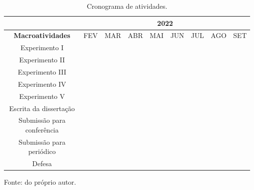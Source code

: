 \begin{table}[H]
    \centering
    \caption{Cronograma de atividades.}
    \label{proposal:cron:table:2}
        \begin{tabular}{|c|c|c|c|c|c|c|l|l|} 
            \hline
                                    & \multicolumn{8}{c|}{2022}                        \\ 
            \hline
            \textbf{Macroatividades}        & FEV & MAR & ABR & MAI & JUN & JUL & AGO & SET  \\ 
            \hline
            Experimento I                   & \cellcolor{midgray} & \cellcolor{midgray} & \cellcolor{midgray} & \cellcolor{midgray} & \cellcolor{midgray} & \cellcolor{midgray} &     &      \\ 
            \hline
            Experimento II                  &     & \cellcolor{midgray} & \cellcolor{midgray} &     &     &     &     &      \\ 
            \hline
            Experimento III                 &     &     &     & \cellcolor{midgray} & \cellcolor{midgray} & \cellcolor{midgray} &     &  \\ 
            \hline
            Experimento IV                  &     &     &     & \cellcolor{midgray} & \cellcolor{midgray} &     &     &      \\ 
            \hline
            Experimento V                   &     &     &     &     &     & \cellcolor{midgray} &     &      \\ 
            \hline
            Escrita da dissertação          & \cellcolor{midgray} & \cellcolor{midgray} & \cellcolor{midgray} & \cellcolor{midgray} & \cellcolor{midgray} & \cellcolor{midgray} & \cellcolor{midgray} &  \\ 
            \hline
            Submissão para conferência      &     &     &     & \cellcolor{midgray} &     &     &     &      \\ 
            \hline
            Submissão para periódico        &     &     &     &     &     &     & \cellcolor{midgray} &      \\ 
            \hline
            Defesa                          &     &     &     &     &     &     &     & \cellcolor{midgray} \\
            \hline
        \end{tabular}
    
    \vspace*{1 cm}
    Fonte: do próprio autor.
\end{table}



